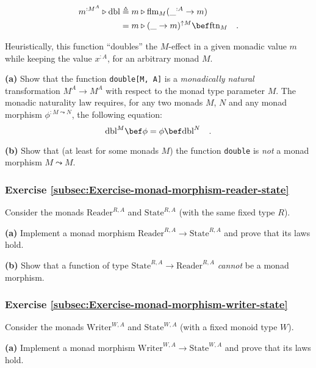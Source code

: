 ~\vspace{-0.4\baselineskip}
\begin{align*}
m^{:M^{A}}\triangleright\text{dbl} & \triangleq m\triangleright\text{flm}_{M}(\_^{:A}\rightarrow m)\\
 & =m\triangleright(\_\rightarrow m)^{\uparrow M}\bef\text{ftn}_{M}\quad.
\end{align*}

Heuristically, this function \textsf{``}doubles\textsf{''} the $M$-effect in a given
monadic value $m$ while keeping the value $x^{:A}$, for an arbitrary
monad $M$. 

\textbf{(a)} Show that the function \lstinline!double[M, A]! is a
\emph{monadically natural} transformation $M^{A}\rightarrow M^{A}$
with respect to the monad type parameter $M$. The monadic naturality
law requires, for any two monads $M$, $N$ and any monad morphism
$\phi^{:M\leadsto N}$, the following equation:
\[
\text{dbl}^{M}\bef\phi=\phi\bef\text{dbl}^{N}\quad.
\]

\textbf{(b)} Show that (at least for some monads $M$) the function
\lstinline!double! is \emph{not} a monad morphism $M\leadsto M$. 

\subsubsection{Exercise \label{subsec:Exercise-monad-morphism-reader-state}\ref{subsec:Exercise-monad-morphism-reader-state}}

Consider the monads $\text{Reader}^{R,A}$ and $\text{State}^{R,A}$
(with the same fixed type $R$). 

\textbf{(a)} Implement a monad morphism $\text{Reader}^{R,A}\rightarrow\text{State}^{R,A}$
and prove that its laws hold.

\textbf{(b)} Show that a function of type $\text{State}^{R,A}\rightarrow\text{Reader}^{R,A}$
\emph{cannot} be a monad morphism.

\subsubsection{Exercise \label{subsec:Exercise-monad-morphism-writer-state}\ref{subsec:Exercise-monad-morphism-writer-state}}

Consider the monads $\text{Writer}^{W,A}$ and $\text{State}^{W,A}$
(with a fixed monoid type $W$). 

\textbf{(a)} Implement a monad morphism $\text{Writer}^{W,A}\rightarrow\text{State}^{W,A}$
and prove that its laws hold.

